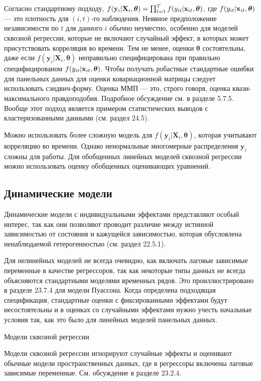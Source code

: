 Согласно стандартному подходу, $f(\mathbf{y}_i|\mathbf{X}_i,\bm\theta)=\prod^T_{t=1} f(y_{it}|\mathbf{x}_{it}, \bm\theta)$, где $f(y_{it}|\mathbf{x}_{it}, \bm\theta)$ --- это плотность для $(i,t)$-го наблюдения. Неявное предположение независимости по $t$  для данного $i$ обычно неуместно, особенно для моделей сквозной регрессии, которые не включают случайный эффект, в которых может присутствовать корреляция во времени.  Тем не менее,  оценки $\bm\theta$ состоятельны, даже  если $f(\mathbf{y}_i|\mathbf{X}_i, \bm\theta)$ неправильно специфицирована при правильно специфицированом $f(y_{it}|\mathbf{x}_{it}, \bm\theta)$. Чтобы получать робастные стандартные ошибки для панельных данных для оценки ковариационной матрицы следует использовать сэндвич-форму. Оценка ММП --- это, строго говоря, оценка квази-максимального правдоподобия. Подробное обсуждение см. в разделе 5.7.5. Вообще этот подход является примером статистических выводов с кластеризованными данными (см. раздел 24.5).

Можно использовать более сложную модель для $f(\mathbf{y}_i|\mathbf{X}_i, \bm\theta)$, которая учитывают корреляцию во времени. Однако ненормальные многомерные распределения $\mathbf{y}_i$ сложны для работы. Для обобщенных линейных моделей сквозной регрессии можно использовать оценку обобщенных оценивающих уравнений.

\subsection{Динамические модели}

Динамические модели с индивидуальными эффектами представляют особый интерес, так как они позволяют проводит различие между истинной зависимостью от состояния и кажущейся зависимостью, которая обусловлена ненаблюдаемой гетерогенностью (см. раздел 22.5.1).

Для нелинейных моделей не всегда очевидно, как включать лаговые зависимые переменные в качестве регрессоров, так как некоторые типы данных не всегда объясняются стандартными моделями временных рядов. Это проиллюстрировано в разделе 23.7.4 для модели Пуассона. Когда определена подходящая спецификация, стандартные оценки с фиксированными эффектами будут несостоятельны и в оценках со случайными эффектами нужно учесть начальные условия так, как это было для линейных моделей панельных данных.

{\centering Модели сквозной регрессии \\}

Модели сквозной регрессии игнорируют случайные эффекты и оценивают обычные модели пространственных данных, где в регрессоры включены лаговые зависимые переменные. См. обсуждение в разделе 23.2.4.

